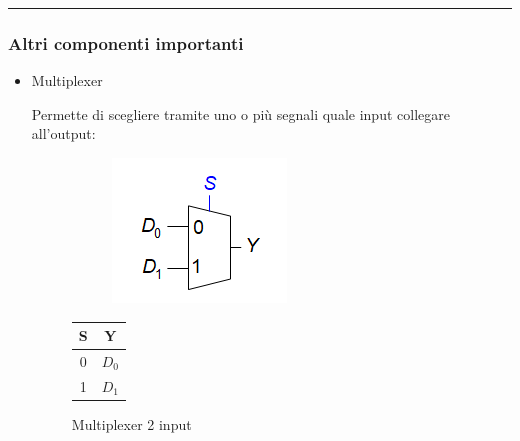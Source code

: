 \documentclass{article}
\begin{document}
\noindent\rule{\textwidth}{0.5pt}

\newpage

\subsubsection{Altri componenti importanti}

\vspace{5pt}

\begin{itemize}
    \item Multiplexer

    \vspace{5pt}

    Permette di scegliere tramite uno o più segnali quale input collegare all'output:

\begin{figure}[ht]
    \begin{minipage}[t]{0.49\textwidth}
        \centering
        \begin{figure}[H]
        \centering
        \includegraphics[width=0.6\linewidth]{multiplexer.png}
        \end{figure}
        \label{fig:multiplexer}
    \end{minipage}
    \begin{minipage}[t]{0.49\textwidth}
    \centering
        \begin{table}[H]
        \centering
        \begin{tabular}{c|c}
            S & Y\\
            \hline
            0 & $D_0$\\
            \hline
            1 & $D_1$\\
        \end{tabular}
    \label{tab:multiplexer}
    \end{table}
\end{minipage}
\caption{Multiplexer 2 input}
\end{figure}


\end{itemize}
\end{document}
